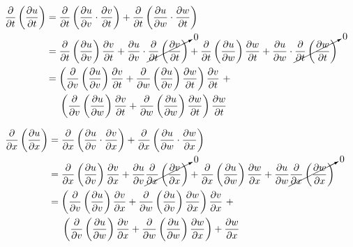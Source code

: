 \begin{enumerate}
    $\begin{aligned}[t]
        \frac{\partial}{\partial t} \left( \frac{\partial u}{\partial t} \right)
         & = \frac{\partial}{\partial t} \left( \frac{\partial u}{\partial v} \cdot \frac{\partial v}{\partial t} \right) + \frac{\partial}{\partial t} \left( \frac{\partial u}{\partial w} \cdot \frac{\partial w}{\partial t} \right) \\
         & = \frac{\partial}{\partial t} \left( \frac{\partial u}{\partial v} \right) \frac{\partial v}{\partial t} + \frac{\partial u}{\partial v} \cdot \cancelto{0}{\frac{\partial}{\partial t} \left( \frac{\partial v}{\partial t} \right)} + \frac{\partial}{\partial t} \left( \frac{\partial u}{\partial w} \right) \frac{\partial w}{\partial t} + \frac{\partial u}{\partial w} \cdot \cancelto{0}{\frac{\partial}{\partial t} \left( \frac{\partial w}{\partial t} \right)} \\
         & = \left( \frac{\partial}{\partial v} \left( \frac{\partial u}{\partial v} \right) \frac{\partial v}{\partial t} + \frac{\partial}{\partial w} \left( \frac{\partial u}{\partial v} \right) \frac{\partial w}{\partial t} \right) \frac{\partial v}{\partial t} ~+ \\ &~~~~ \left( \frac{\partial}{\partial v} \left( \frac{\partial u}{\partial w} \right) \frac{\partial v}{\partial t} + \frac{\partial}{\partial w} \left( \frac{\partial u}{\partial w} \right) \frac{\partial w}{\partial t} \right) \frac{\partial w}{\partial t}
    \end{aligned}$

    $\begin{aligned}[t]
        \frac{\partial}{\partial x} \left( \frac{\partial u}{\partial x} \right) 
         & = \frac{\partial}{\partial x} \left( \frac{\partial u}{\partial v} \cdot \frac{\partial v}{\partial x} \right) + \frac{\partial}{\partial x} \left( \frac{\partial u}{\partial w} \cdot \frac{\partial w}{\partial x} \right) \\
         & = \frac{\partial}{\partial x} \left( \frac{\partial u}{\partial v} \right) \frac{\partial v}{\partial x} + \frac{\partial u}{\partial v} \cancelto{0}{\frac{\partial}{\partial x} \left( \frac{\partial v}{\partial x} \right)} + \frac{\partial}{\partial x} \left( \frac{\partial u}{\partial w} \right) \frac{\partial w}{\partial x} + \frac{\partial u}{\partial w} \cancelto{0}{\frac{\partial}{\partial x} \left( \frac{\partial w}{\partial x} \right)} \\
         & = \left( \frac{\partial}{\partial v} \left( \frac{\partial u}{\partial v} \right) \frac{\partial v}{\partial x} + \frac{\partial}{\partial w} \left( \frac{\partial u}{\partial v} \right) \frac{\partial w}{\partial x} \right) \frac{\partial v}{\partial x} ~+ \\ &~~~~ \left( \frac{\partial}{\partial v} \left( \frac{\partial u}{\partial w} \right) \frac{\partial v}{\partial x} + \frac{\partial}{\partial w} \left( \frac{\partial u}{\partial w} \right) \frac{\partial w}{\partial x} \right) + \frac{\partial w}{\partial x}
    \end{aligned}$


\end{enumerate}
